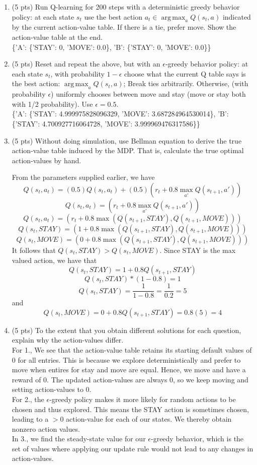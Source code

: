 \documentclass[a4paper]{article}
\theoremstyle{definition}
\DeclareMathOperator*{\argmax}{arg\,max}
\begin{document}
\begin{enumerate}
\item (5 pts) Run Q-learning for 200 steps with a deterministic greedy behavior policy: at each state $s_t$ use the best action $a_t \in \argmax_a Q(s_t,a)$ indicated by the current action-value table. If there is a tie, prefer move. Show the action-value table at the end.
\\\{'A': \{'STAY': 0, 'MOVE': 0.0\}, 'B': \{'STAY': 0, 'MOVE': 0.0\}\}

\item (5 pts) Reset and repeat the above, but with an $\epsilon$-greedy behavior policy: at each state $s_t$, with probability $1-\epsilon$ choose what the current Q table says is the best action: $\argmax_a Q(s_t,a)$; Break ties arbitrarily. Otherwise, (with probability $\epsilon$) uniformly chooses between move and stay (move or stay both with 1/2 probability). Use $\epsilon=0.5$.
\\\{'A': \{'STAY': 4.999975828096329, 'MOVE': 3.687284964530014\}, 'B': \{'STAY': 4.700927716064728, 'MOVE': 3.999969476317586\}\}

\item (5 pts) Without doing simulation, use Bellman equation to derive the true action-value table induced by the MDP. That is, calculate the true optimal action-values by hand.

From the parameters supplied earlier, we have
$$Q(s_t, a_t) = (0.5) Q(s_t, a_t) + (0.5) \left( r_t + 0.8 \max_{a'} Q(s_{t+1}, a') \right)$$
$$Q(s_t, a_t) = \left( r_t + 0.8 \max_{a'} Q(s_{t+1}, a') \right)$$
$$Q(s_t, a_t) = \left( r_t + 0.8 \max (Q(s_{t+1}, STAY),Q(s_{t+1}, MOVE))  \right)$$
$$Q(s_t, STAY) = \left( 1 + 0.8 \max (Q(s_{t+1}, STAY),Q(s_{t+1}, MOVE)) \right)$$
$$Q(s_t, MOVE) = \left( 0 + 0.8 \max (Q(s_{t+1}, STAY),Q(s_{t+1}, MOVE)) \right)$$
It follows that $Q(s_t, STAY) > Q(s_t, MOVE)$. Since STAY is the max valued action, we have that
$$Q(s_t, STAY) = 1 + 0.8 Q(s_{t+1}, STAY)$$
$$Q(s_t, STAY) * (1-0.8) = 1$$
$$Q(s_t, STAY) = \frac{1}{1-0.8} = \frac{1}{0.2} = 5$$
and 
$$Q(s_t, MOVE) = 0 + 0.8 Q(s_{t+1}, STAY) = 0.8 (5) = 4$$

\item (5 pts) To the extent that you obtain different solutions for each question, explain why the action-values  differ.
\\For 1., We see that the action-value table retains its starting default values of 0 for all entries. This is because we explore deterministically and prefer to move when entires for stay and move are equal. Hence, we move and have a reward of 0. The updated action-values are always 0, so we keep moving and setting action-values to 0.
\\For 2., the $\epsilon$-greedy policy makes it more likely for random actions to be chosen and thus explored. This means the STAY action is sometimes chosen, leading to a $> 0$ action-value for each of our states. We thereby obtain nonzero action values.
\\In 3., we find the steady-state value for our $\epsilon$-greedy behavior, which is the set of values where applying our update rule would not lead to any changes in action-values.


\end{enumerate}
\end{document}
